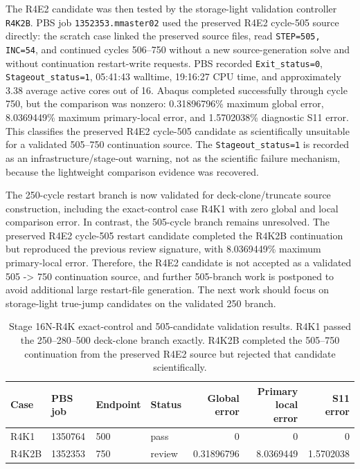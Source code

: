 \documentclass[11pt,a4paper]{article}
\newcommand{\code}[1]{\texttt{#1}}
\begin{document}
The R4E2 candidate was then tested by the storage-light validation controller \code{R4K2B}. PBS job \code{1352353.mmaster02} used the preserved R4E2 cycle-505 source directly: the scratch case linked the preserved source files, read \code{STEP=505, INC=54}, and continued cycles 506--750 without a new source-generation solve and without continuation restart-write requests. PBS recorded \code{Exit\_status=0}, \code{Stageout\_status=1}, 05:41:43 walltime, 19:16:27 CPU time, and approximately 3.38 average active cores out of 16. Abaqus completed successfully through cycle 750, but the comparison was nonzero: 0.31896796\% maximum global error, 8.0369449\% maximum primary-local error, and 1.5702038\% diagnostic S11 error. This classifies the preserved R4E2 cycle-505 candidate as scientifically unsuitable for a validated 505--750 continuation source. The \code{Stageout\_status=1} is recorded as an infrastructure/stage-out warning, not as the scientific failure mechanism, because the lightweight comparison evidence was recovered.

The 250-cycle restart branch is now validated for deck-clone/truncate source construction, including the exact-control case R4K1 with zero global and local comparison error. In contrast, the 505-cycle branch remains unresolved. The preserved R4E2 cycle-505 restart candidate completed the R4K2B continuation but reproduced the previous review signature, with 8.0369449\% maximum primary-local error. Therefore, the R4E2 candidate is not accepted as a validated 505 -> 750 continuation source, and further 505-branch work is postponed to avoid additional large restart-file generation. The next work should focus on storage-light true-jump candidates on the validated 250 branch.

\begin{table}[H]
\centering
\small
\begin{tabular}{llllrrr}
\toprule
Case & PBS job & Endpoint & Status & Global error & Primary local error & S11 error \\
\midrule
R4K1 & 1350764 & 500 & pass & 0 & 0 & 0 \\
R4K2B & 1352353 & 750 & review & 0.31896796 & 8.0369449 & 1.5702038 \\
\bottomrule
\end{tabular}
\caption{Stage 16N-R4K exact-control and 505-candidate validation results. R4K1 passed the 250--280--500 deck-clone branch exactly. R4K2B completed the 505--750 continuation from the preserved R4E2 source but rejected that candidate scientifically.}
\end{table}
\end{document}
